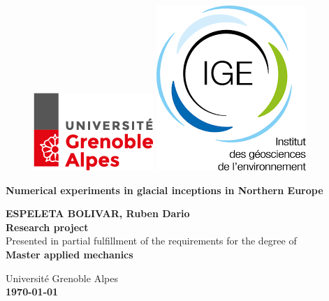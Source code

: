\thispagestyle{empty}
\begin{center}
    	\begin{figure} [t]
		\includegraphics[width=0.2\linewidth]{../fig/logo_UGA.png}
		\hspace{8.0cm}
		\includegraphics[width=0.2\linewidth]{../fig/logo_IGE.png}
		\vspace{2.0cm}
	    \end{figure}

        \begin{Large}
        \textbf{Numerical experiments in glacial inceptions in Northern Europe} 
        \end{Large}
        
        \vspace{0.8cm}
        \textbf{ESPELETA BOLIVAR, Ruben Dario}\\
        \vspace{3.0cm}
        \textbf{Research project}\\
	    Presented in partial fulfillment of the requirements for the degree of\\
	    \textbf{Master applied mechanics}\\
        \vspace{3.0cm}

        Université Grenoble Alpes\\
        \textbf{\today}
        \vspace{4.0cm}
\end{center}
\clearpage
